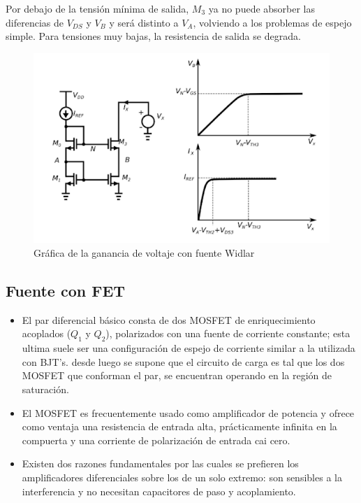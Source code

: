 \documentclass[conference]{IEEEtran} %
\begin{document}
Por debajo de la tensión mínima de salida, $M_3$ ya no puede 
absorber las diferencias de $V_{DS}$ y $V_B$ y será distinto a 
$V_A$, volviendo a los problemas de espejo simple. Para tensiones
muy bajas, la resistencia de salida se degrada.

\begin{figure}
	\centering
	\includegraphics[scale=0.5]{IMAGENES/image4.png}
	\caption{Gráfica de la ganancia de voltaje con fuente Widlar}
\end{figure}


\subsection{Fuente con FET}


\begin{itemize}
	\item El par diferencial básico consta de dos MOSFET de enriquecimiento acoplados ($Q_1$ y $Q_2$), polarizados con una fuente de corriente constante; esta ultima suele ser una configuración de espejo de corriente similar a la utilizada con BJT’s. desde luego se supone que el circuito de carga es tal que los dos MOSFET que conforman el par, se encuentran operando en la región de saturación.
	\item El MOSFET es frecuentemente usado como amplificador de potencia y ofrece como ventaja una resistencia de entrada alta, prácticamente infinita en la compuerta y una corriente de polarización de entrada cai cero.
	\item Existen dos razones fundamentales por las cuales se prefieren los amplificadores diferenciales sobre los de un solo extremo: son sensibles a la interferencia y no necesitan capacitores de paso y acoplamiento.
\end{itemize}
\end{document}
